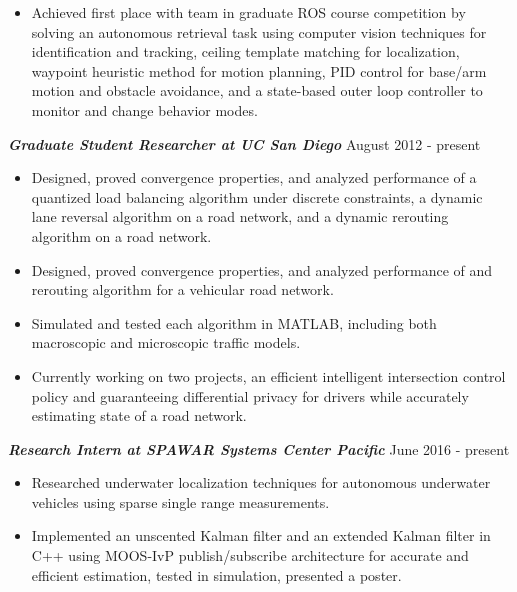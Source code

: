 \documentclass{res}
\begin{document}
\begin{resume}
\begin{itemize}
\vspace*{-.5ex}
\item Achieved first place with team in graduate ROS course competition by solving an autonomous retrieval task using computer vision techniques for identification and tracking, ceiling template matching for localization, waypoint heuristic method for motion planning, PID control for base/arm motion and obstacle avoidance, and a state-based outer loop controller to monitor and change behavior modes.
\end{itemize}
\vspace*{-1ex}
{\sl  \bf Graduate Student Researcher at UC San Diego} \hfill August 2012 - present
\vspace*{.5ex}
\begin{itemize}
\item Designed, proved convergence properties, and analyzed performance of a quantized load balancing algorithm under discrete constraints, a dynamic lane reversal algorithm on a road network, and a dynamic rerouting algorithm on a road network.
\vspace*{-.5ex}
\item Designed, proved convergence properties, and analyzed performance of and rerouting algorithm for a vehicular road network. 
\vspace*{-.5ex}
\item Simulated and tested each algorithm in MATLAB, including both macroscopic and microscopic traffic models.
\vspace*{-.5ex}
\item Currently working on two projects, an efficient intelligent intersection control policy and guaranteeing differential privacy for drivers while accurately estimating state of a road network.
\end{itemize}
{\sl \bf Research Intern at SPAWAR Systems Center Pacific } \hfill June 2016 - present
\vspace*{.5ex}
\begin{itemize}
\item Researched underwater localization techniques for autonomous underwater vehicles using sparse single range measurements. 
\vspace*{-.5ex}
\item Implemented an unscented Kalman filter and an extended Kalman filter in C++ using MOOS-IvP publish/subscribe architecture for accurate and efficient estimation, tested in simulation, presented a poster.
\vspace*{-.5ex}

\end{itemize}
\end{resume}
\end{document}
